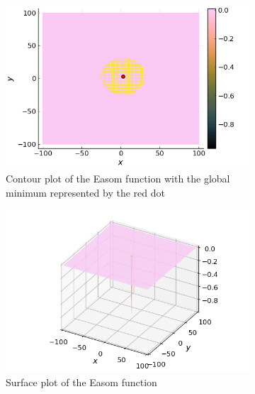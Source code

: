 \begin{figure}[ht!]
  \centering
  \begin{subfigure}[b]{0.45\textwidth}
    \centering
    \includegraphics[width=\textwidth]{img/test_functions/easom_contour.png}
    \caption{
      Contour plot of the Easom function with the global minimum represented by 
      the red dot
    }
    \label{fig:app:test:easom:contour}
  \end{subfigure}
  \hfill
  \begin{subfigure}[b]{0.45\textwidth}
    \centering
    \includegraphics[width=\textwidth]{img/test_functions/easom_surface.png}
    \caption{Surface plot of the Easom function}
    \label{fig:app:test:easom:surface}
  \end{subfigure}
  \begin{subfigure}[b]{0.45\textwidth}
    \centering

\end{subfigure}
\end{figure}
